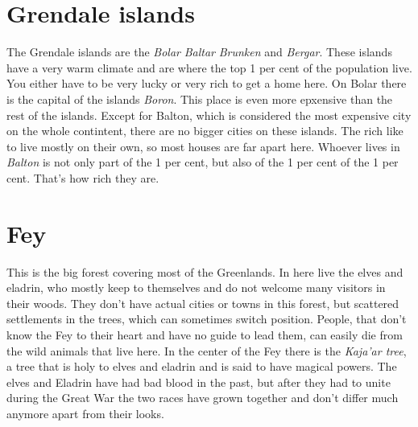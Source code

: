 \documentclass[oneside]{book}
\begin{document}
	\section{Grendale islands}
	The Grendale islands are the \textit{Bolar} \textit{Baltar} \textit{Brunken} and \textit{Bergar}.
	These islands have a very warm climate and are where the top 1 per cent of the population live. You either have to be very lucky or very rich to get a home here.
	On Bolar there is the capital of the islands \textit{Boron}. This place is even more epxensive than the rest of the islands. 
	Except for Balton, which is considered the most expensive city on the whole contintent, there are no bigger cities on these islands.
	The rich like to live mostly on their own, so most houses are far apart here.
	Whoever lives in \textit{Balton} is not only part of the 1 per cent, but also of the 1 per cent of the 1 per cent. That's how rich they are.
	
	\section{Fey}
	This is the big forest covering most of the Greenlands. In here live the elves and eladrin, who mostly keep to themselves and do not welcome many visitors in their woods.
	They don't have actual cities or towns in this forest, but scattered settlements in the trees, which can sometimes switch position.
	People, that don't know the Fey to their heart and have no guide to lead them, can easily die from the wild animals that live here.
	In the center of the Fey there is the \textit{Kaja'ar tree}, a tree that is holy to elves and eladrin and is said to have magical powers. 
	The elves and Eladrin have had bad blood in the past, but after they had to unite during the Great War the two races have grown together and don't differ much anymore apart from their looks.
	
\end{document}
